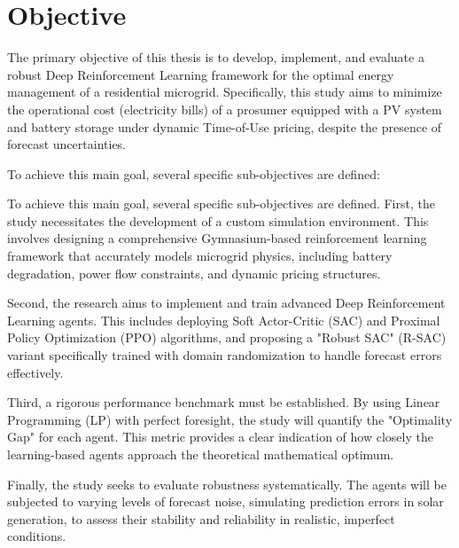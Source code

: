 
\section{Objective}

The primary objective of this thesis is to develop, implement, and evaluate a robust Deep Reinforcement Learning framework for the optimal energy management of a residential microgrid. Specifically, this study aims to minimize the operational cost (electricity bills) of a prosumer equipped with a PV system and battery storage under dynamic Time-of-Use pricing, despite the presence of forecast uncertainties.

To achieve this main goal, several specific sub-objectives are defined:

To achieve this main goal, several specific sub-objectives are defined. First, the study necessitates the development of a custom simulation environment. This involves designing a comprehensive Gymnasium-based reinforcement learning framework that accurately models microgrid physics, including battery degradation, power flow constraints, and dynamic pricing structures.

Second, the research aims to implement and train advanced Deep Reinforcement Learning agents. This includes deploying Soft Actor-Critic (SAC) and Proximal Policy Optimization (PPO) algorithms, and proposing a "Robust SAC" (R-SAC) variant specifically trained with domain randomization to handle forecast errors effectively.

Third, a rigorous performance benchmark must be established. By using Linear Programming (LP) with perfect foresight, the study will quantify the "Optimality Gap" for each agent. This metric provides a clear indication of how closely the learning-based agents approach the theoretical mathematical optimum.

Finally, the study seeks to evaluate robustness systematically. The agents will be subjected to varying levels of forecast noise, simulating prediction errors in solar generation, to assess their stability and reliability in realistic, imperfect conditions.
